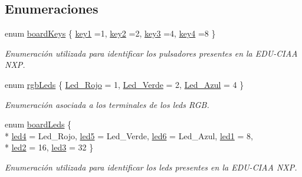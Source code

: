 \subsection*{Enumeraciones}
\begin{DoxyCompactItemize}
\item 
enum \hyperlink{group__hardware_ga8d70125ca4047f0f7ea513cd8568953d}{board\+Keys} \{ \hyperlink{group__hardware_gga8d70125ca4047f0f7ea513cd8568953da483a28cafb544915d9cd44f2c69fc706}{key1} =1, 
\hyperlink{group__hardware_gga8d70125ca4047f0f7ea513cd8568953dab8d9f65fc5604a8b8a0cdcbaf03bbbe0}{key2} =2, 
\hyperlink{group__hardware_gga8d70125ca4047f0f7ea513cd8568953da376c29473ae1a854ff46b2b171985093}{key3} =4, 
\hyperlink{group__hardware_gga8d70125ca4047f0f7ea513cd8568953da84011848209e666e74469d6dfba542eb}{key4} =8
 \}\begin{DoxyCompactList}\small\item\em Enumeración utilizada para identificar los pulsadores presentes en la E\+D\+U-\/\+C\+I\+AA N\+XP. \end{DoxyCompactList}
\item 
enum \hyperlink{group__hardware_ga84e58e8cc8e3fe349be97bcd3221c360}{rgb\+Leds} \{ \hyperlink{group__hardware_gga84e58e8cc8e3fe349be97bcd3221c360a5662baf6795c7030ea75e47a0019a61d}{Led\+\_\+\+Rojo} = 1, 
\hyperlink{group__hardware_gga84e58e8cc8e3fe349be97bcd3221c360aa5ad7834a37faf1e2620fa3db1838a21}{Led\+\_\+\+Verde} = 2, 
\hyperlink{group__hardware_gga84e58e8cc8e3fe349be97bcd3221c360a90357fded550cd38cda43991725234cb}{Led\+\_\+\+Azul} = 4
 \}\begin{DoxyCompactList}\small\item\em Enumeración asociada a los terminales de los leds R\+GB. \end{DoxyCompactList}
\item 
enum \hyperlink{group__hardware_ga2a000bf02da2abba53355f3fcfdb2d0b}{board\+Leds} \{ \\*
\hyperlink{group__hardware_gga2a000bf02da2abba53355f3fcfdb2d0ba76aaf0c615e41c008aa876ea4c183f4c}{led4} = Led\+\_\+\+Rojo, 
\hyperlink{group__hardware_gga2a000bf02da2abba53355f3fcfdb2d0ba66b97e4de94e08d049b57ac98e315cad}{led5} = Led\+\_\+\+Verde, 
\hyperlink{group__hardware_gga2a000bf02da2abba53355f3fcfdb2d0ba2c4a58277fd326a128900fe0904c2b1e}{led6} = Led\+\_\+\+Azul, 
\hyperlink{group__hardware_gga2a000bf02da2abba53355f3fcfdb2d0bacc803913e7d21f9a6900861008580c5f}{led1} = 8, 
\\*
\hyperlink{group__hardware_gga2a000bf02da2abba53355f3fcfdb2d0ba9c2c88fba1581ccd42348c9e3c47df92}{led2} = 16, 
\hyperlink{group__hardware_gga2a000bf02da2abba53355f3fcfdb2d0ba16d63d90ec9dc8c27019e7c28ff1cfc0}{led3} = 32
 \}\begin{DoxyCompactList}\small\item\em Enumeración utilizada para identificar los leds presentes en la E\+D\+U-\/\+C\+I\+AA N\+XP. \end{DoxyCompactList}
\end{DoxyCompactItemize}
